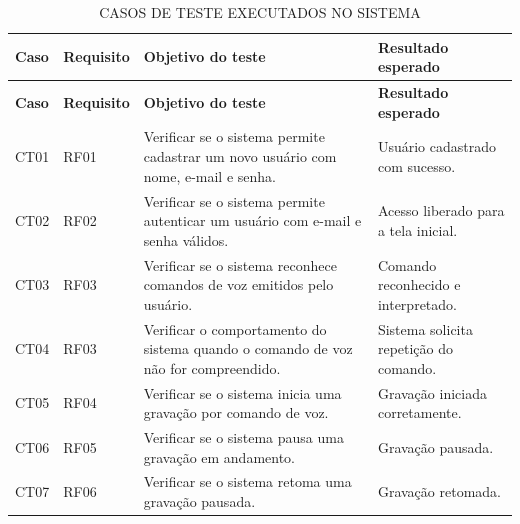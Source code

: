 \documentclass[12pt,oneside,a4paper,brazil,final]{abntex2}
\begin{document}
\begin{longtable}{|p{1.5cm}|p{2.4cm}|p{5.8cm}|p{4.7cm}|}

\caption{CASOS DE TESTE EXECUTADOS NO SISTEMA}

\label{tab:casos-teste}\\

\hline

\textbf{Caso} & \textbf{Requisito} & \textbf{Objetivo do teste} & \textbf{Resultado esperado} \\

\hline

\endfirsthead



\hline

\textbf{Caso} & \textbf{Requisito} & \textbf{Objetivo do teste} & \textbf{Resultado esperado} \\

\hline

\endhead



CT01 & RF01 & Verificar se o sistema permite cadastrar um novo usuário com nome, e-mail e senha. & Usuário cadastrado com sucesso. \\

\hline

CT02 & RF02 & Verificar se o sistema permite autenticar um usuário com e-mail e senha válidos. & Acesso liberado para a tela inicial. \\

\hline

CT03 & RF03 & Verificar se o sistema reconhece comandos de voz emitidos pelo usuário. & Comando reconhecido e interpretado. \\

\hline

CT04 & RF03 & Verificar o comportamento do sistema quando o comando de voz não for compreendido. & Sistema solicita repetição do comando. \\

\hline

CT05 & RF04 & Verificar se o sistema inicia uma gravação por comando de voz. & Gravação iniciada corretamente. \\

\hline

CT06 & RF05 & Verificar se o sistema pausa uma gravação em andamento. & Gravação pausada. \\

\hline

CT07 & RF06 & Verificar se o sistema retoma uma gravação pausada. & Gravação retomada. \\


\end{longtable}
\end{document}
